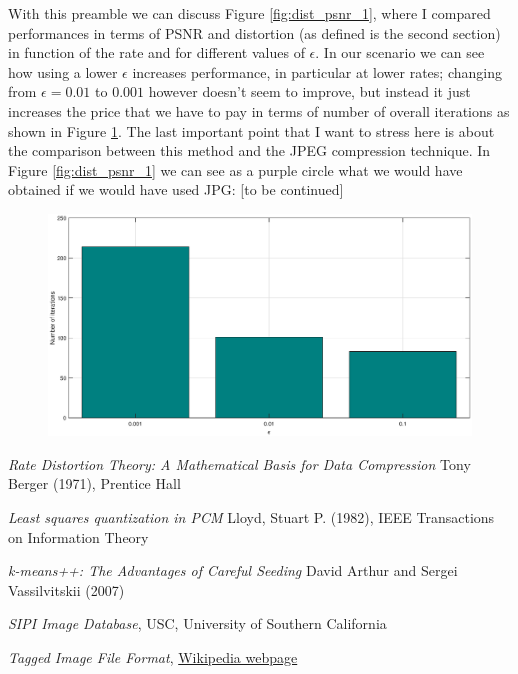\documentclass{article}
\begin{document}
With this preamble we can discuss Figure \ref{fig:dist_psnr_1}, where I compared performances in terms of PSNR and distortion (as defined is the second section) in function of the rate and for different values of $\epsilon$. In our scenario we can see how using a lower $\epsilon$ increases performance, in particular at lower rates; changing from $\epsilon = 0.01$ to $0.001$ however doesn't seem to improve, but instead it just increases the price that we have to pay in terms of number of overall iterations as shown in Figure \ref{fig:iterations_1}. The last important point that I want to stress here is about the comparison between this method and the JPEG compression technique. In Figure \ref{fig:dist_psnr_1} we can see as a purple circle what we would have obtained if we would have used JPG: [to be continued]
\begin{figure}
	\centering
	\includegraphics[scale=.4]{img/1/iterations}
	\caption{}
	\label{fig:iterations_1}
\end{figure}


\clearpage

\begin{thebibliography}{9}
		
		\textit{Rate Distortion Theory: A Mathematical Basis for Data Compression}
		Tony Berger (1971), Prentice Hall
		
		\textit{Least squares quantization in PCM}
		Lloyd, Stuart P. (1982), IEEE Transactions on Information Theory
		
		\textit{k-means++: The Advantages of Careful Seeding}
		David Arthur and Sergei Vassilvitskii (2007)
		
		\textit{SIPI Image Database},
		USC, University of Southern California
	
		\textit{Tagged Image File Format},
		\href{https://it.wikipedia.org/wiki/Tagged_Image_File_Format}{Wikipedia webpage}
	
	
\end{thebibliography}
\end{document}
